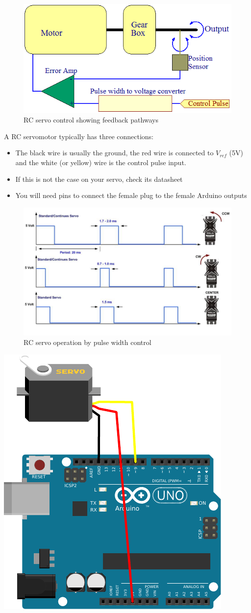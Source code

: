 \documentclass{instructions}
\begin{document}
\begin{figure}[h!]
    \centering
    \includegraphics[width=0.6\linewidth]{figs/servo2}
    \caption{RC servo control showing feedback pathways}
    \label{closedloop}
\end{figure}

A RC servomotor typically has three connections:

\begin{itemize}
    \item The black wire is usually the ground, the red wire is connected to
        $V_{ref}$ (5V)
    and the white (or yellow) wire is the control pulse input.
\item If this is not the case on your servo, check its datasheet
\item You will need pins to connect the female plug to the female Arduino
  outputs
\end{itemize}

\begin{figure}[bh!]
    \centering
    \includegraphics[width=0.7\linewidth]{figs/servo-pwm}
    \caption{RC servo operation by pulse width control}
    \label{pwm}
\end{figure}


\begin{center}
    \includegraphics[width=0.4\linewidth]{servo-arduino}
\end{center}
\end{document}
